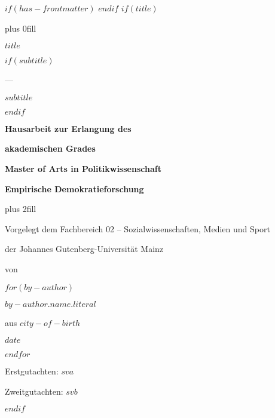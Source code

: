 \renewcommand*{\chaptermarkformat}{%
}
\rehead[\pagemark]{\textsc{\headmark} {   } \pagemark}
$if(has-frontmatter)$
\frontmatter
$endif$
$if(title)$
\cleardoublepage
\thispagestyle{empty}
{\centering
\hbox{}\vskip 0cm plus 0fill
{\large $title$ \par}
$if(subtitle)$
{\large --- \par}
{\large $subtitle$ \par}
$endif$
\vspace{40ex}
{\large\bfseries Hausarbeit zur Erlangung des \par}
{\large\bfseries akademischen Grades \par}
{\large\bfseries Master of Arts in Politikwissenschaft \par}
{\large\bfseries Empirische Demokratieforschung \par}
\vskip 0cm plus 2fill
{\large Vorgelegt dem Fachbereich 02 -- Sozialwissenschaften, Medien und Sport \par}
{\large der Johannes Gutenberg-Universität Mainz \par}
{\large von \par}
$for(by-author)$
{\large $by-author.name.literal$ \par}
{\large aus $city-of-birth$ \par}
{\large $date$ \par}
$endfor$%
}
\restoregeometry
\pagebreak
\thispagestyle{empty}
\vspace*{\fill}
{\large Erstgutachten: $sva$ \par}
{\large Zweitgutachten: $svb$ \par}
$endif$
\let\mainmatterreal\mainmatter
\let\mainmatter\relax
